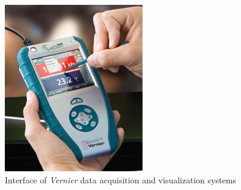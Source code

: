\begin{frame}
\begin{columns}
    \includegraphics[width=\textwidth]{slides/sysdev-embedded-linux/vernier-gui.jpg}\\
    Interface of {\em Vernier} data acquisition and visualization systems
  \end{columns}
\end{frame}

